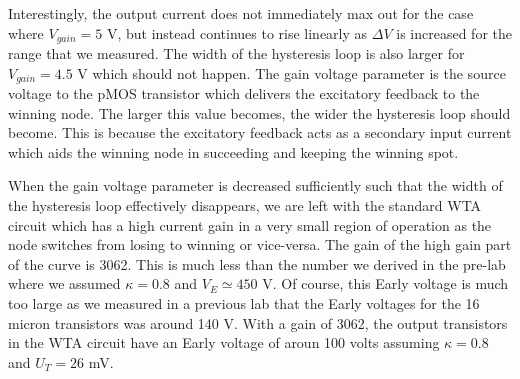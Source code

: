 Interestingly, the output current does not immediately max out for the case where \(V_{gain}=5 \) V, but instead continues to rise linearly
as \(\Delta V\) is increased for the range that we measured. The width of the hysteresis loop is also larger for \(V_{gain}=4.5\) V which should not happen.
The gain voltage parameter is the source voltage to the pMOS transistor which delivers the excitatory feedback to the winning node. The larger this value becomes,
the wider the hysteresis loop should become. This is because the excitatory feedback acts as a secondary input current which aids the winning node in succeeding and keeping
the winning spot.

When the gain voltage parameter is decreased sufficiently such that the width of the hysteresis loop effectively disappears, we are left with the standard WTA circuit
which has a high current gain in a very small region of operation as the node switches from losing to winning or vice-versa. The gain of the high gain part of the
curve is 3062. This is much less than the number we derived in the pre-lab where we assumed \(\kappa = 0.8\) and \(V_E \simeq 450\) V. Of course, this Early voltage is
much too large as we measured in a previous lab that the Early voltages for the 16 micron transistors was around 140 V. With a gain of 3062, the output transistors
in the WTA circuit have an Early voltage of aroun 100 volts assuming \(\kappa = 0.8\) and \(U_T = 26\) mV.


